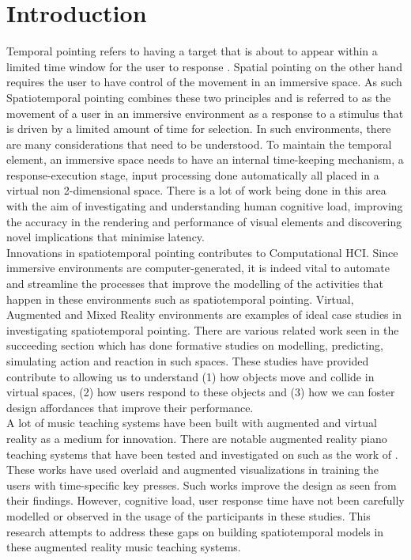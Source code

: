 \documentclass{article}
\begin{document}
\section{Introduction}
Temporal pointing refers to having a target that is about to appear within a limited time window for the user to response \cite{lee2016website}. Spatial pointing on the other hand requires the user to have control of the movement in an immersive space. As such Spatiotemporal pointing combines these two principles and is referred to as the movement of a user in an immersive environment as a response to a stimulus that is driven by a limited amount of time for selection. In such environments, there are many considerations that need to be understood. To maintain the temporal element, an immersive space needs to have an internal time-keeping mechanism, a response-execution stage, input processing done automatically all placed in a virtual non 2-dimensional space. There is a lot of work being done in this area with the aim of investigating and understanding human cognitive load, improving the accuracy in the rendering and performance of visual elements and discovering novel implications that minimise latency.\\

Innovations in spatiotemporal pointing contributes to Computational HCI. Since immersive environments are computer-generated, it is indeed vital to automate and streamline the processes that improve the modelling of the activities that happen in these environments such as spatiotemporal pointing. Virtual, Augmented and Mixed Reality environments are examples of ideal case studies in investigating spatiotemporal pointing. There are various related work seen in the succeeding section which has done formative studies on modelling, predicting, simulating action and reaction in such spaces. These studies have provided contribute to allowing us to understand (1) how objects move and collide in virtual spaces, (2) how users respond to these objects and (3) how we can foster design affordances that improve their performance. \\

A lot of music teaching systems have been built with augmented and virtual reality as a medium for innovation. There are notable augmented reality piano teaching systems that have been tested and investigated on such as the work of \cite{rogers2014piano, sun2018mr, birhanu2017keynvision}. These works have used overlaid and augmented visualizations in training the users with time-specific key presses. Such works improve the design as seen from their findings. However, cognitive load, user response time have not been carefully modelled or observed in the usage of the participants in these studies. This research attempts to address these gaps on building spatiotemporal models in these augmented reality music teaching systems. 
\end{document}
